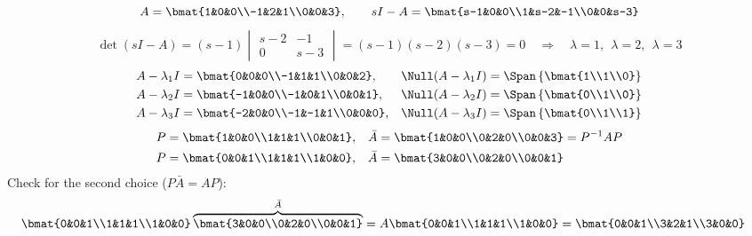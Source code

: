 \begin{example}
\[
A=\bmat{1&0&0\\-1&2&1\\0&0&3},\qquad sI-A=\bmat{s-1&0&0\\1&s-2&-1\\0&0&s-3}
\]
\[
\det(sI-A)=(s-1)\begin{vmatrix}s-2&-1\\0&s-3\end{vmatrix} = (s-1)(s-2)(s-3)=0
\quad\Rightarrow\quad \lambda=1,\ \ \lambda=2,\ \ \lambda=3
\]
\begin{align*}
A-\lambda_1 I &= \bmat{0&0&0\\-1&1&1\\0&0&2}, & \Null(A-\lambda_1 I)&=\Span\left\{\bmat{1\\1\\0}\right\}\\
A-\lambda_2 I &= \bmat{-1&0&0\\-1&0&1\\0&0&1}, & \Null(A-\lambda_2 I)&=\Span\left\{\bmat{0\\1\\0}\right\}\\
A-\lambda_3 I &= \bmat{-2&0&0\\-1&-1&1\\0&0&0}, & \Null(A-\lambda_3 I)&=\Span\left\{\bmat{0\\1\\1}\right\}
\end{align*}
\begin{align*}
P&=\bmat{1&0&0\\1&1&1\\0&0&1}, & \bar A&=\bmat{1&0&0\\0&2&0\\0&0&3}=P^{-1}AP\\
P&=\bmat{0&0&1\\1&1&1\\1&0&0}, & \bar A&=\bmat{3&0&0\\0&2&0\\0&0&1}
\end{align*}
Check for the second choice ($P\bar A=AP$):
\begin{align*}
\bmat{0&0&1\\1&1&1\\1&0&0}\overbrace{\bmat{3&0&0\\0&2&0\\0&0&1}}^{\bar A} &= A\bmat{0&0&1\\1&1&1\\1&0&0}
= \bmat{0&0&1\\3&2&1\\3&0&0}
\end{align*}
\end{example}

